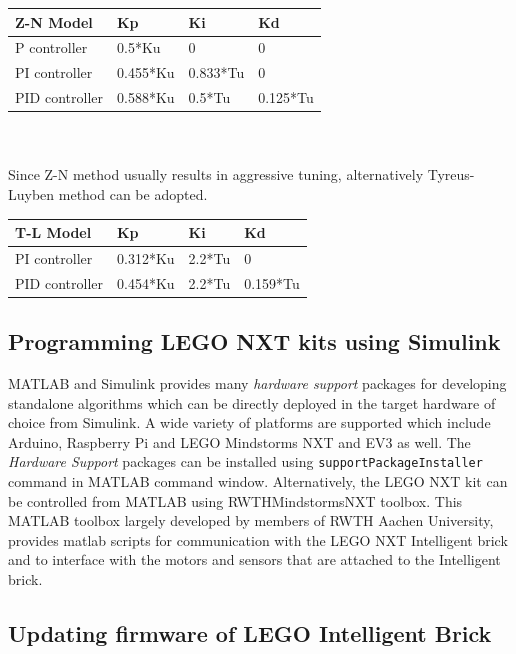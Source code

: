 \documentclass[paper=a4, fontsize=11pt]{scrartcl}
\numberwithin{equation}{section}        %
\numberwithin{figure}{section}          %
\numberwithin{table}{section}           %
\begin{document}
\begin{tabular}{|l|l|l|l|}
\hline
       Z-N Model      & Kp       & Ki       & Kd       \\      
\hline
       P controller   & 0.5*Ku   & 0        & 0        \\
\hline
       PI controller  & 0.455*Ku & 0.833*Tu & 0        \\
\hline
       PID controller & 0.588*Ku & 0.5*Tu   & 0.125*Tu \\
\hline
\end{tabular}
\\
\\
Since Z-N method usually results in aggressive tuning, alternatively Tyreus-Luyben method can be adopted.
\\
\begin{tabular}{|l|l|l|l|}
\hline
       T-L Model      & Kp       & Ki     & Kd       \\
\hline
       PI controller  & 0.312*Ku & 2.2*Tu & 0        \\
\hline
       PID controller & 0.454*Ku & 2.2*Tu & 0.159*Tu \\
\hline
\end{tabular}

\subsection{Programming LEGO NXT kits using Simulink}
MATLAB and Simulink provides many \emph{hardware support} packages for developing standalone algorithms which can be directly deployed in the target hardware of choice from Simulink. A wide variety of platforms are supported which include Arduino, Raspberry Pi and LEGO Mindstorms NXT and EV3 as well. The \emph{Hardware Support} packages can be installed using \verb|supportPackageInstaller| command in MATLAB command window.
Alternatively, the LEGO NXT kit can be controlled from MATLAB using RWTHMindstormsNXT toolbox. This MATLAB toolbox largely developed by members of RWTH Aachen University, provides matlab scripts for communication with the LEGO NXT Intelligent brick and to interface with the motors and sensors that are attached to the Intelligent brick.

\subsection{Updating firmware of LEGO Intelligent Brick}

\end{document}
